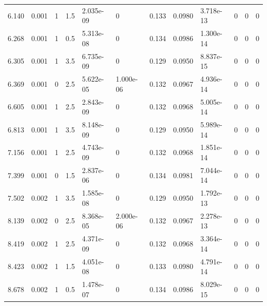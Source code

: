 \documentclass[preview]{standalone}
\begin{document}
{{\begin{tabular}{L{1.2cm}C{1.2cm} C{0.3cm}C{0.5cm} C{1.4cm}C{1.4cm} C{1.4cm}C{1.4cm} C{1.6cm}C{1.6cm} C{1.6cm}C{1.6cm}}
  6.140  &  0.001  & 1     & 1.5 &  2.035e-09  & 0  &  0.133&   0.0980& 3.718e-13 & 0   &  0 & 0  \\ 
  6.268  &  0.001  & 1     & 0.5 &  5.313e-08  & 0  &  0.134&   0.0986& 1.300e-14 & 0   &  0 & 0  \\ 
  6.305  &  0.001  & 1     & 3.5 &  6.735e-09  & 0  &  0.129&   0.0950& 8.837e-15 & 0   &  0 & 0  \\ 
  6.369  &  0.001  & 0     & 2.5 &  5.622e-05  & 1.000e-06  &  0.132&   0.0967& 4.936e-14 & 0   &  0 & 0  \\ 
  6.605  &  0.001  & 1     & 2.5 &  2.843e-09  & 0  &  0.132&   0.0968& 5.005e-14 & 0   &  0 & 0  \\ 
  6.813  &  0.001  & 1     & 3.5 &  8.148e-09  & 0  &  0.129&   0.0950& 5.989e-14 & 0   &  0 & 0  \\ 
  7.156  &  0.001  & 1     & 2.5 &  4.743e-09  & 0  &  0.132&   0.0968& 1.851e-14 & 0   &  0 & 0  \\ 
  7.399  &  0.001  & 0     & 1.5 &  2.837e-06  & 0  &  0.134&   0.0981& 7.044e-14 & 0   &  0 & 0  \\ 
  7.502  &  0.002  & 1     & 3.5 &  1.585e-08  & 0  &  0.129&   0.0950& 1.792e-13 & 0   &  0 & 0  \\ 
  8.139  &  0.002  & 0     & 2.5 &  8.368e-05  & 2.000e-06  &  0.132&   0.0967& 2.278e-13 & 0   &  0 & 0  \\ 
  8.419  &  0.002  & 1     & 2.5 &  4.371e-09  & 0  &  0.132&   0.0968& 3.364e-14 & 0   &  0 & 0  \\ 
  8.423  &  0.002  & 1     & 1.5 &  4.051e-08  & 0  &  0.133&   0.0980& 4.791e-14 & 0   &  0 & 0  \\ 
  8.678  &  0.002  & 1     & 0.5 &  1.478e-07  & 0  &  0.134&   0.0986& 8.029e-15 & 0   &  0 & 0  \\ 
\hline 
\end{tabular} 

}}
\end{document}
